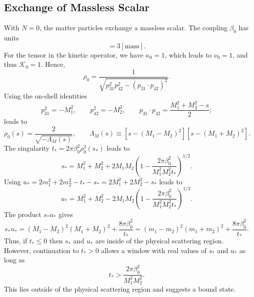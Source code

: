 \subsection{Exchange of Massless Scalar}
With $N = 0$, the matter particles exchange a massless scalar. The coupling $\beta_{0}$ has units
\begin{equation}
	[\beta_{0}] = 3 [\text{mass}].
\end{equation}
For the tensor in the kinetic operator, we have $\kappa_{0} = 1$, which leads to $\nu_{0} = 1$, and thus $\mathcal{K}_{0} = 1$. Hence,
\begin{equation}
	\rho_{0} = \frac{1}{\sqrt{p_{31}^{2} p_{42}^{2} - (p_{31} \cdot p_{42})^{2}}}.
\end{equation}
Using the on-shell identities
\begin{equation}
	p_{31}^{2} = -M_{1}^{2}, \qquad p_{42}^{2} = -M_{2}^{2}, \qquad p_{31} \cdot p_{42} = \frac{M_{1}^{2} + M_{2}^{2} - s}{2};
\end{equation}
leads to
\begin{equation}
	\rho_{0}(s) = \frac{2}{\sqrt{-\Lambda_{M}(s)}}, \qquad \Lambda_{M}(s) \equiv [s - (M_{1} - M_{2})^{2}] [s - (M_{1} + M_{2})^{2}].
\end{equation}
The singularity $t_{*} = 2 \pi \beta_{0}^{2} \rho_{0}^{2}(s_{*})$ leads to
\begin{equation}
	s_{*} = M_{1}^{2} + M_{2}^{2} + 2 M_{1} M_{2} \left(1 - \frac{2 \pi \beta_{0}^{2}}{M_{1}^{2} M_{2}^{2} t_{*}} \right)^{1/2}.
	\label{3s0}
\end{equation}
Using $u_{*} = 2m_{1}^{2} + 2m_{2}^{2} - t_{*} - s_{*}= 2M_{1}^{2} + 2M_{2}^{2} - s_{*}$ leads to
\begin{equation}
	u_{*} = M_{1}^{2} + M_{2}^{2} - 2 M_{1} M_{2} \left(1 - \frac{2 \pi \beta_{0}^{2}}{M_{1}^{2} M_{2}^{2} t_{*}} \right)^{1/2}.
\end{equation}
The product $s_{*} u_{*}$ gives
\begin{equation}
	s_{*} u_{*} = (M_{1} - M_{2})^{2}(M_{1} + M_{2})^{2} + \frac{8 \pi \beta_{0}^{2}}{t_{*}}
	= (m_{1} - m_{2})^{2}(m_{1} + m_{2})^{2} + \frac{8 \pi \beta_{0}^{2}}{t_{*}}.
	\label{3su0}
\end{equation}
Thus, if $t_{*} \leq 0$ then $s_{*}$ and $u_{*}$ are inside of the physical scattering region. However, continuation to $t_{*} > 0$ allows a window with real values of $s_{*}$ and $u_{*}$ as long as
\begin{equation}
	t_{*} > \frac{2 \pi \beta_{0}^{2}}{M_{1}^{2} M_{2}^{2}}.
\end{equation}
This lies outside of the physical scattering region and suggests a bound state.

